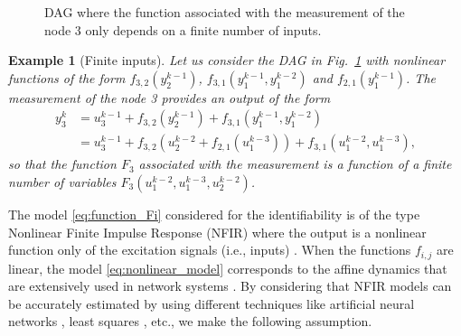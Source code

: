 \documentclass[letterpaper,10pt,journal]{IEEEtran}
\newtheorem{example}{Example}
\begin{document}
\begin{figure}[!t]
    \centering
    \caption{DAG where the function associated with the measurement of the node $3$ only depends on a finite number of inputs.}
    \label{fig:DAG_volterra}
\end{figure}

\begin{example}[Finite inputs]\label{ex:finite_delays}
    Let us consider the DAG in Fig.~\ref{fig:DAG_volterra} with nonlinear functions of the form $f_{3,2}(y_2^{k-1})$,  $f_{3,1}(y_1^{k-1},y_1^{k-2})$ and $f_{2,1}(y_1^{k-1})$. The measurement of the node 3 provides an output of the form
    \begin{align}
        y_3^k&=u_3^{k-1}+f_{3,2}(y_2^{k-1})+f_{3,1}(y_1^{k-1},y_1^{k-2})\nonumber\\
        &=u_3^{k-1}+f_{3,2}(u_2^{k-2}+f_{2,1}(u_1^{k-3}))+f_{3,1}(u_1^{k-2},u_1^{k-3})\label{eq:finite_delays},
    \end{align}
    so that the function $F_3$ associated with the measurement is a function of a finite number of variables $F_3(u_1^{k-2},u_1^{k-3},u_2^{k-2})$.
\end{example}


The model \eqref{eq:function_Fi} considered for the identifiability is of the type Nonlinear Finite Impulse Response (NFIR) where the output is a nonlinear function only of the excitation signals (i.e., inputs) \cite{ramirez2021nonlinear,pillonetto2025deep,nelles2020nonlinear}. When the functions $f_{i,j}$ are linear, the model \eqref{eq:nonlinear_model} corresponds to the affine dynamics that are extensively used in network systems \cite{ravazzi2014ergodic}. By considering that NFIR models can be accurately estimated by using different techniques like artificial neural networks \cite{ramirez2021nonlinear}, least squares \cite{makila2005lti}, etc., we make the following assumption.
\end{document}

